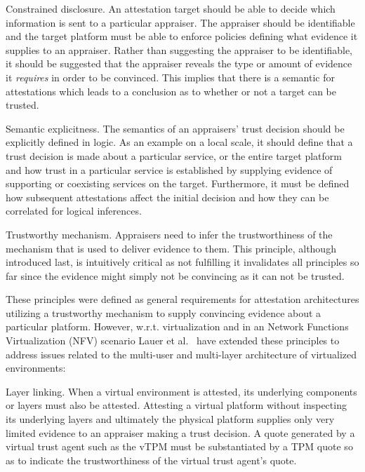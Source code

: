 \begin{prince}\label{pri:3} Constrained disclosure. An attestation target should be able to decide which information is sent to a particular appraiser. The appraiser should be identifiable and the target platform must be able to enforce policies defining what evidence it supplies to an appraiser. Rather than suggesting the appraiser to be identifiable, it should be suggested that the appraiser reveals the type or amount of evidence it \emph{requires} in order to be convinced. This implies that there is a semantic for attestations which leads to a conclusion as to whether or not a target can be trusted.  
\end{prince}

\begin{prince}\label{pri:4} Semantic explicitness. The semantics of an appraisers' trust decision should be explicitly defined in logic. As an example on a local scale, it should define that a trust decision is made about a particular service, or the entire target platform and how trust in a particular service is established by supplying evidence of supporting or coexisting services on the target. Furthermore, it must be defined how subsequent attestations affect the initial decision and how they can be correlated for logical inferences. 
\end{prince}

\begin{prince}\label{pri:5} Trustworthy mechanism. Appraisers need to infer the trustworthiness of the mechanism that is used to deliver evidence to them. This principle, although introduced last, is intuitively critical as not fulfilling it invalidates all principles so far since the evidence might simply not be convincing as it can not be trusted. 
\end{prince}

These principles were defined as general requirements for attestation architectures utilizing a trustworthy mechanism to supply convincing evidence about a particular platform. However, w.r.t. virtualization and in an Network Functions Virtualization (NFV) scenario Lauer et al.~\cite{lauer2016} have extended these principles to address issues related to the multi-user and multi-layer architecture of virtualized environments:

\begin{prince}\label{pri:6} Layer linking. When a virtual environment is attested, its underlying components or layers must also be attested. Attesting a virtual platform without inspecting its underlying layers and ultimately the physical platform supplies only very limited evidence to an appraiser making a trust decision. A quote generated by a virtual trust agent such as the vTPM must be substantiated by a TPM quote so as to indicate the trustworthiness of the virtual trust agent's quote. 
\end{prince}

